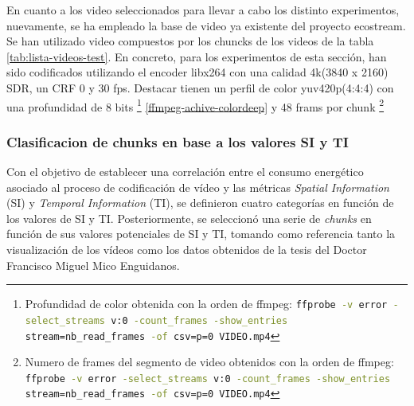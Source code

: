 En cuanto a los video seleccionados para llevar a cabo los distinto experimentos, nuevamente, se ha empleado la base de video ya existente del proyecto ecostream. Se han utilizado video compuestos por los chuncks de los videos de la tabla  \ref{tab:lista-videos-test}. En concreto, para los experimentos de esta sección, han sido codificados utilizando el encoder libx264 con una calidad 4k(3840 x 2160) SDR, un CRF 0 y 30 fps. Destacar tienen un perfil de color yuv420p(4:4:4) con una profundidad de 8 bits  \footnote{Profundidad de color obtenida con la orden de ffmpeg: \lstinline[language=sh]{ffprobe -v error -select_streams v:0 -count_frames -show_entries stream=nb_read_frames -of csv=p=0 VIDEO.mp4}} \ref{ffmpeg-achive-colordeep} y 48 frams por chunk \footnote{Numero de frames del segmento de video obtenidos con la orden de ffmpeg: \lstinline[language=sh]{ffprobe -v error -select_streams v:0 -count_frames -show_entries stream=nb_read_frames -of csv=p=0 VIDEO.mp4}}


\subsubsection{Clasificacion de chunks en base a los valores SI y TI}
 
Con el objetivo de establecer una correlación entre el consumo energético asociado al proceso de codificación de vídeo y las métricas \textit{Spatial Information} (SI) y \textit{Temporal Information} (TI), se definieron cuatro categorías en función de los valores de SI y TI. Posteriormente, se seleccionó una serie de \textit{chunks} en función de sus valores potenciales de SI y TI, tomando como referencia tanto la visualización de los vídeos como los datos obtenidos de la tesis del Doctor Francisco Miguel Mico Enguidanos.

